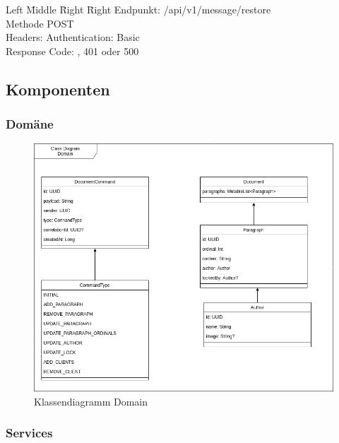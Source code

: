 \begin{tabbing}
    Left \= Middle \= Right \= Right \kill
    Endpunkt:  \> \> \> /api/v1/message/restore\\
    Methode \>  \> \> POST\\
    Headers:  \> \>   \> Authentication: Basic\\
    Response Code:  \> \>  , 401 oder 500 \\
\end{tabbing}

\clearpage

\subsection{Komponenten}


\subsubsection{Domäne}

\begin{figure}[h]
    \centering
    \begin{minipage}[b]{0.8\textwidth}
        \includegraphics[width=\textwidth]{graphics/class-be-domain.drawio}
        \caption{Klassendiagramm Domain}
    \end{minipage}
\end{figure}

\clearpage

\subsubsection{Services}

